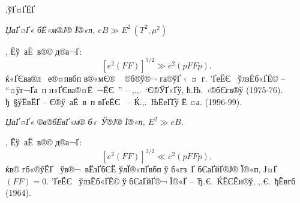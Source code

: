 
\begin{Slide}{‚ўҐ¤Ґ­ЁҐ} 

\begin{center}

\vspace*{5mm}

\centerline{\blue \it ЏаҐ¤Ґ« бЁ«м­®Ј® Ї®«п, $e B \gg E^2 \, (T^2, \mu^2)$}

\vspace*{5mm}

‚ Ё­ў аЁ ­в­®© д®а¬Ґ:
%
$$\left[e^2 (F F)\right]^{3/2} \gg e^2 (p F F p) .$$
%
ќ«ҐЄва®­л ­ е®¤пвбп в®«мЄ® ­  ®б­®ў­®¬ га®ў­Ґ ‹ ­¤ г.
’Ґе­ЁЄ  ўлзЁб«Ґ­Ё© -- ``¤ўг¬Ґа­ п н«ҐЄва®¤Ё­ ¬ЁЄ '' -- 
‚.‚.~‘Є®ЎҐ«Ґў, ћ.Њ.~‹®бЄгв®ў (1975-76). 
ђ §ўЁвЁҐ -- Є®ў аЁ ­в­ п вҐе­ЁЄ  -- Ќ.‚.~ЊЁеҐҐў Ё ¤а. (1996-99).


\vspace*{5mm}

\centerline{\blue \it ЏаҐ¤Ґ« ®в­®бЁвҐ«м­® б« Ў®Ј® Ї®«п, $E^2 \gg e B$.}

\vspace*{5mm}

‚ Ё­ў аЁ ­в­®© д®а¬Ґ:
%
$$\left[e^2 (F F)\right]^{3/2} \ll e^2 (p F F p) .$$
%
ќв® гб«®ўЁҐ  ўв®¬ вЁзҐбЄЁ ўлЇ®«­пҐвбп ў б«гз Ґ бЄаҐйҐ­­®Ј® Ї®«п, 
Ј¤Ґ $(F F) = 0$. 
’Ґе­ЁЄ  ўлзЁб«Ґ­Ё© ў бЄаҐйҐ­­®¬ Ї®«Ґ -- Ђ.€.~ЌЁЄЁи®ў, ‚.€.~ђЁвгб (1964).

\end{center}

\end{Slide}


